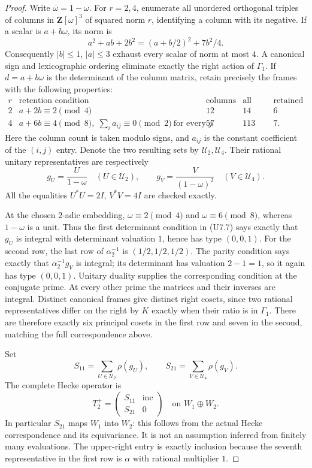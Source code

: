 \begin{proof}
Write $\overline\omega=1-\omega$. For $r=2,4$, enumerate all
unordered orthogonal triples of columns in $\mathbf Z[\omega]^3$
of squared norm $r$, identifying a column with its negative. If a
scalar is $a+b\omega$, its norm is
\[
 a^2+ab+2b^2=(a+b/2)^2+7b^2/4.
 \tag{U7.6}
\]
Consequently $|b|\le1$, $|a|\le3$ exhaust every scalar of norm at
most $4$. A canonical sign and lexicographic ordering eliminate
exactly the right action of $\Gamma_1$. If $d=a+b\omega$ is the
determinant of the column matrix, retain precisely the frames with
the following properties:
\[
 \begin{array}{c|l|r|r|r}
 r&\text{retention condition}&\text{columns}
                &\text{all frames}&\text{retained}\\ \hline
 2&a+2b\equiv2\pmod4&12&14&6\\
 4&a+6b\equiv4\pmod8,
       \;\sum_i a_{ij}\equiv0\pmod2\ \text{for every }j
       &57&113&7.
 \end{array}
 \tag{U7.7}
\]
Here the column count is taken modulo signs, and $a_{ij}$ is the
constant coefficient of the $(i,j)$ entry.
Denote the two resulting sets by $\mathcal U_2,\mathcal U_4$.
Their rational unitary representatives are respectively
\[
 g_U=\frac{U}{1-\omega}\quad(U\in\mathcal U_2),
 \qquad
 g_V=\frac{V}{(1-\omega)^2}\quad(V\in\mathcal U_4).
 \tag{U7.8}
\]
All the equalities $U^*U=2I$, $V^*V=4I$ are checked exactly.

At the chosen $2$-adic embedding, $\omega\equiv2\pmod4$ and
$\omega\equiv6\pmod8$, whereas $1-\omega$ is a unit. Thus the
first determinant condition in (U7.7) says exactly that $g_U$ is
integral with determinant valuation $1$, hence has type $(0,0,1)$.
For the second row, the last row of $\alpha_2^{-1}$ is
$(1/2,1/2,1/2)$. The parity condition says exactly that
$\alpha_2^{-1}g_V$ is integral; its determinant has valuation
$2-1=1$, so it again has type $(0,0,1)$. Unitary duality supplies
the corresponding condition at the conjugate prime. At every
other prime the matrices and their inverses are integral.
Distinct canonical frames give distinct right cosets, since two
rational representatives differ on the right by $K$ exactly when
their ratio is in $\Gamma_1$. There are therefore exactly six
principal cosets in the first row and seven in the second, matching
the full correspondence above.

Set
\[
 S_{11}=\sum_{U\in\mathcal U_2}\rho(g_U),
 \qquad S_{21}=\sum_{V\in\mathcal U_4}\rho(g_V).
\]
The complete Hecke operator is
\[
 T_2^+=\begin{pmatrix}S_{11}&\operatorname{inc}\\
                           S_{21}&0\end{pmatrix}
       \quad\text{on }W_1\oplus W_2.
 \tag{U7.9}
\]
In particular $S_{21}$ maps $W_1$ into $W_2$: this follows from the
actual Hecke correspondence and its equivariance. It is not an
assumption inferred from finitely many evaluations. The upper-right
entry is exactly inclusion because the seventh representative in
the first row is $\alpha$ with rational multiplier $1$.


\end{proof}
